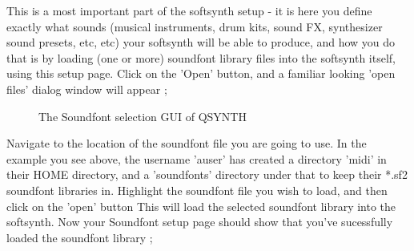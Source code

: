 \documentclass[letterpaper]{report}
\begin{document}
This is a most important part of the softsynth setup - it is here you
define exactly what sounds (musical instruments, drum kits, sound FX,
synthesizer sound presets, etc, etc) your softsynth will be able to produce,
and how you do that is by loading (one or more) soundfont library files
into the softsynth itself, using this setup page. Click on the 'Open'
button, and a familiar looking 'open files' dialog window will appear ;



\begin{figure}
\caption{The Soundfont selection GUI of QSYNTH}
\end{figure}


Navigate to the location of the soundfont file you are going to use.
In the example you see above, the username 'auser' has created a
directory 'midi' in their HOME directory, and a 'soundfonts' directory
under that to keep their *.sf2 soundfont libraries in. Highlight the
soundfont file you wish to load, and then click on the 'open' button
This will load the selected soundfont library into the softsynth. Now
your Soundfont setup page should show that you've sucessfully loaded 
the soundfont library ;
\end{document}
